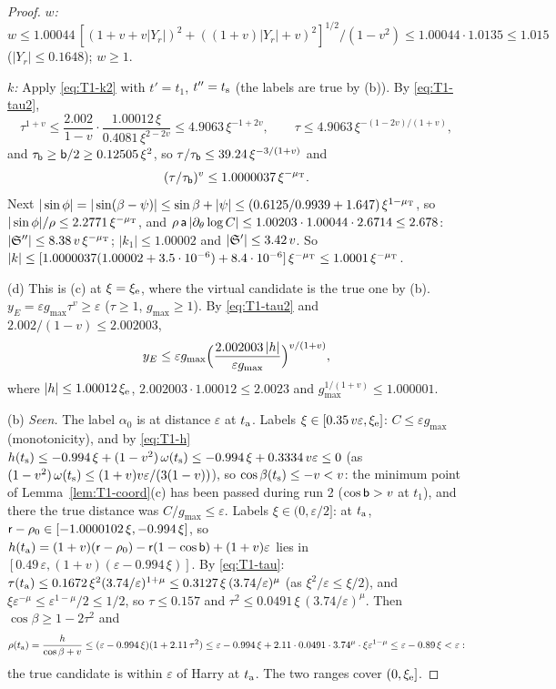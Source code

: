 \begin{proof}
\emph{$w$:} $w\le1.00044\,[(1+v+v|Y_r|)^2+((1+v)|Y_r|+v)^2]^{1/2}/(1-v^2)\le1.00044\cdot1.0135\le1.015$ ($|Y_r|\le0.1648$); $w\ge1$.

\emph{$k$:} Apply \eqref{eq:T1-k2} with $t'=t_1$, $t''=t_{\mathrm s}$ (the labels are true by (b)). By \eqref{eq:T1-tau2},
\[
\tau^{1+v}\le\frac{2.002}{1-v}\cdot\frac{1.00012\,\xi}{0.4081\,\xi^{2-2v}}\le4.9063\,\xi^{-1+2v},\qquad
\tau\le4.9063\,\xi^{-(1-2v)/(1+v)},
\]
and $\tau_{\mathsf b}\ge\mathsf b/2\ge0.12505\,\xi^2$, so $\tau/\tau_{\mathsf b}\le39.24\,\xi^{-3/(1+v)}$ and
\[
(\tau/\tau_{\mathsf b})^v\le1.0000037\,\xi^{-\mu_{\mathrm T}}.
\]
Next $|\sin\phi|=|\sin(\beta-\psi)|\le\sin\beta+|\psi|\le(0.6125/0.9939+1.647)\,\xi^{1-\mu_{\mathrm T}}$, so
$|\sin\phi|/\rho\le2.2771\,\xi^{-\mu_{\mathrm T}}$, and $\rho\,\mathsf a\,|\partial_\theta\log C|\le1.00203\cdot1.00044\cdot2.6714\le2.678$:
$|\mathfrak S''|\le8.38\,v\,\xi^{-\mu_{\mathrm T}}$; $|k_1|\le1.00002$ and $|\mathfrak S'|\le3.42\,v$. So
$|k|\le[1.0000037(1.00002+3.5\cdot10^{-6})+8.4\cdot10^{-6}]\,\xi^{-\mu_{\mathrm T}}\le1.0001\,\xi^{-\mu_{\mathrm T}}$.

(d) This is (c) at $\xi=\xi_{\mathrm e}$, where the virtual candidate is the true one by (b). $y_E=\varepsilon g_{\max}\tau^v\ge\varepsilon$
($\tau\ge1$, $g_{\max}\ge1$). By \eqref{eq:T1-tau2} and $2.002/(1-v)\le2.002003$,
\[
y_E\le\varepsilon g_{\max}\Bigl(\frac{2.002003\,|h|}{\varepsilon g_{\max}}\Bigr)^{v/(1+v)},
\]
where $|h|\le1.00012\,\xi_{\mathrm e}$, $2.002003\cdot1.00012\le2.0023$ and $g_{\max}^{1/(1+v)}\le1.000001$.

(b) \emph{Seen.} The label $\alpha_0$ is at distance $\varepsilon$ at $t_{\mathrm a}$. Labels $\xi\in[0.35\,v\varepsilon,\xi_{\mathrm e}]$:
$C\le\varepsilon g_{\max}$ (monotonicity), and by \eqref{eq:T1-h}
$h(t_{\mathrm s})\le-0.994\,\xi+(1-v^2)\,\omega(t_{\mathrm s})\le-0.994\,\xi+0.3334\,v\varepsilon\le0$
(as $(1-v^2)\,\omega(t_{\mathrm s})\le(1+v)v\varepsilon/(3(1-v))$), so $\cos\beta(t_{\mathrm s})\le-v<v$: the minimum point of Lemma~\ref{lem:T1-coord}(c)
has been passed during run 2 ($\cos\mathsf b>v$ at $t_1$), and there the true distance was $C/g_{\max}\le\varepsilon$. Labels
$\xi\in(0,\varepsilon/2]$: at $t_{\mathrm a}$, $\mathsf r-\rho_0\in[-1.0000102\,\xi,-0.994\,\xi]$, so
$h(t_{\mathrm a})=(1+v)(\mathsf r-\rho_0)-\mathsf r(1-\cos\mathsf b)+(1+v)\varepsilon$ lies in $[0.49\,\varepsilon,(1+v)(\varepsilon-0.994\,\xi)]$. By
\eqref{eq:T1-tau}: $\tau(t_{\mathrm a})\le0.1672\,\xi^2(3.74/\varepsilon)^{1+\mu}\le0.3127\,\xi\,(3.74/\varepsilon)^\mu$ (as
$\xi^2/\varepsilon\le\xi/2$), and $\xi\varepsilon^{-\mu}\le\varepsilon^{1-\mu}/2\le1/2$, so $\tau\le0.157$ and
$\tau^2\le0.0491\,\xi\,(3.74/\varepsilon)^\mu$. Then $\cos\beta\ge1-2\tau^2$ and
\[
\rho(t_{\mathrm a})=\frac h{\cos\beta+v}\le(\varepsilon-0.994\,\xi)(1+2.11\,\tau^2)
\le\varepsilon-0.994\,\xi+2.11\cdot0.0491\cdot3.74^\mu\cdot\xi\varepsilon^{1-\mu}\le\varepsilon-0.89\,\xi<\varepsilon :
\]
the true candidate is within $\varepsilon$ of Harry at $t_{\mathrm a}$. The two ranges cover $(0,\xi_{\mathrm e}]$.


\end{proof}
